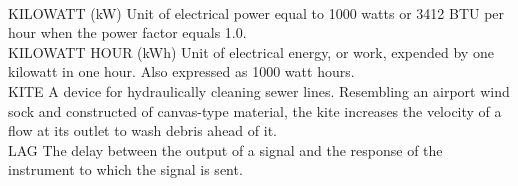 \vspace{0.3cm}\\
KILOWATT (kW)
Unit of electrical power equal to 1000 watts or 3412 BTU per hour when the power factor equals 1.0.
\vspace{0.3cm}\\
KILOWATT HOUR (kWh)
Unit of electrical energy, or work, expended by one kilowatt in one hour. Also expressed as 1000 watt hours.
\vspace{0.3cm}\\
KITE
A device for hydraulically cleaning sewer lines. Resembling an airport wind sock and constructed of canvas-type material, the kite increases the velocity of a flow at its outlet to wash debris ahead of it. 
\vspace{0.3cm}\\
LAG
The delay between the output of a signal and the response of the instrument to which the signal is sent.
\vspace{0.3cm}\\


